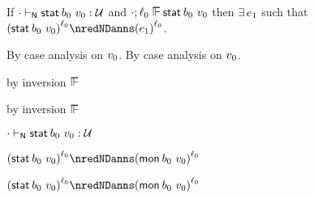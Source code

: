 \begin{lemma}\label{H-sta-label-progress}
  If\/ ${\cdot} \vdash_{\mathsf{N}} \mathsf{stat}^{}\,b_0~v_0 : {\mathcal U}$
  and\/ $\snil; \sowner_0 \sWSOP \estab{\sbnd_0}{\svalue_0}$
  then\/ $\exists\,e_1$
  such that\/ $\obars{\estab{\sbnd_0}{\svalue_0}}{\sowner_0} \nredNDanns \obars{\sexpr_1}{\sowner_0}$.
\end{lemma}{
  \newcommand{\shortproof}{By case analysis on $\svalue_0$.}
\begin{lamportproof*}
  \shortproof
\mainproof
  \shortproof

    \begin{pfproof}
      by inversion $\sWSOP$
    \end{pfproof}

    \begin{pfproof}
      by inversion $\sWSOP$
    \end{pfproof}

    \begin{pfproof}
      \absurdstep
        \begin{pfproof}
          ${\cdot} \vdash_{\mathsf{N}} \mathsf{stat}^{}\,b_0~v_0 : {\mathcal U}$
        \end{pfproof}
    \end{pfproof}

    \begin{pfproof}
      \qedstep
        \begin{pfproof}
          $\obars{\estab{\sbnd_0}{\svalue_0}}{\sowner_0} \nredNDanns \obars{\emon{\sbnd_0}{\svalue_0}}{\sowner_0}$
        \end{pfproof}
    \end{pfproof}

    \begin{pfproof}
      \qedstep
        \begin{pfproof}
          $\obars{\estab{\sbnd_0}{\svalue_0}}{\sowner_0} \nredNDanns \obars{\emon{\sbnd_0}{\svalue_0}}{\sowner_0}$
        \end{pfproof}
    \end{pfproof}


\end{lamportproof*}}
